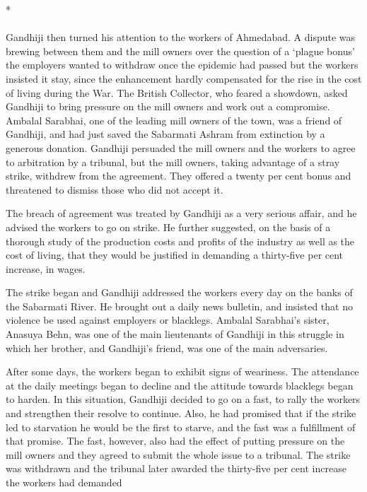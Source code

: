 \begin{center}*\end{center}

\paragraph*{}


Gandhiji then turned his attention to the workers of Ahmedabad. A dispute was brewing between them and the mill owners over the question of a `plague bonus' the employers wanted to withdraw once the epidemic had passed but the workers insisted it stay, since the enhancement hardly compensated for the rise in the cost of living during the War. The British Collector, who feared a showdown, asked Gandhiji to bring pressure on the mill owners and work out a compromise. Ambalal Sarabhai, one of the leading mill owners of the town, was a friend of Gandhiji, and had just saved the Sabarmati Ashram from extinction by a generous donation. Gandhiji persuaded the mill owners and the workers to agree to arbitration by a tribunal, but the mill owners, taking advantage of a stray strike, withdrew from the agreement. They offered a twenty per cent bonus and threatened to dismiss those who did not accept it.

The breach of agreement was treated by Gandhiji as a very serious affair, and he advised the workers to go on strike. He further suggested, on the basis of a thorough study of the production costs and profits of the industry as well as the cost of living, that they would be justified in demanding a thirty-five per cent increase, in wages.

The strike began and Gandhiji addressed the workers every day on the banks of the Sabarmati River. He brought out a daily news bulletin, and insisted that no violence be used against employers or blacklegs. Ambalal Sarabhai's sister, Anasuya Behn, was one of the main lieutenants of Gandhiji in this struggle in which her brother, and Gandhiji's friend, was one of the main adversaries.

After some days, the workers began to exhibit signs of weariness. The attendance at the daily meetings began to decline and the attitude towards blacklegs began to harden. In this situation, Gandhiji decided to go on a fast, to rally the workers and strengthen their resolve to continue. Also, he had promised that if the strike led to starvation he would be the first to starve, and the fast was a fulfillment of that promise. The fast, however, also had the effect of putting pressure on the mill owners and they agreed to submit the whole issue to a tribunal. The strike was withdrawn and the tribunal later awarded the thirty-five per cent increase the workers had demanded

